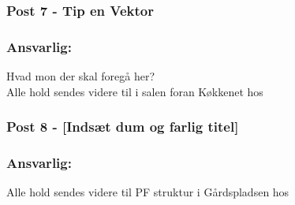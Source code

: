 \subsubsection*{\textbf{Post 7 - Tip en Vektor}}
\subsubsection*{\textbf{Ansvarlig:} \Farav}
Hvad mon der skal foregå her?\\
Alle hold sendes videre til  i salen foran Køkkenet hos 


\subsubsection*{\textbf{Post 8 - [Indsæt dum og farlig titel]}}
\subsubsection*{\textbf{Ansvarlig:} }


Alle hold sendes videre til PF struktur i Gårdspladsen hos \Clint